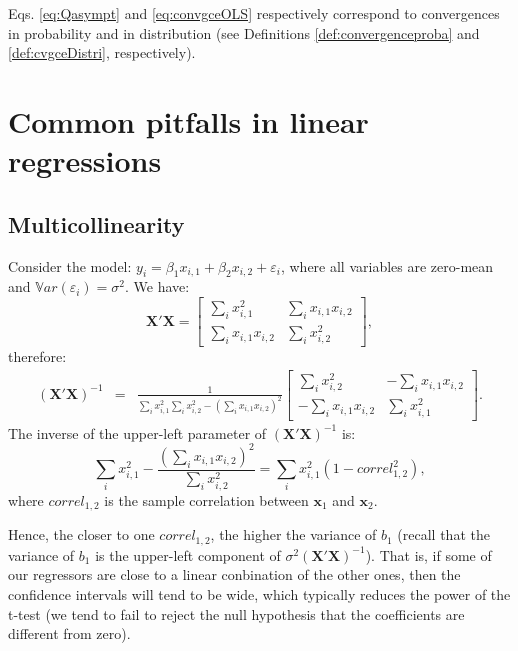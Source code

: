 \documentclass[
  12pt,
]{book}
\theoremstyle{definition}
\theoremstyle{definition}
\theoremstyle{definition}
\theoremstyle{definition}
\theoremstyle{remark}
\begin{document}
Eqs. \eqref{eq:Qasympt} and \eqref{eq:convgceOLS} respectively correspond to convergences in probability and in distribution (see Definitions \ref{def:convergenceproba} and \ref{def:cvgceDistri}, respectively).

\hypertarget{CommonPitfalls}{%
\section{Common pitfalls in linear regressions}\label{CommonPitfalls}}

\hypertarget{multicollinearity}{%
\subsection{Multicollinearity}\label{multicollinearity}}

Consider the model: \(y_i = \beta_1 x_{i,1} + \beta_2 x_{i,2} + \varepsilon_i\), where all variables are zero-mean and \(\mathbb{V}ar(\varepsilon_i)=\sigma^2\). We have:
\[
\mathbf{X}'\mathbf{X} = \left[ \begin{array}{cc}
\sum_i x_{i,1}^2 & \sum_i x_{i,1} x_{i,2} \\
\sum_i x_{i,1} x_{i,2} & \sum_i x_{i,2}^2
\end{array}\right],
\]
therefore:
\begin{eqnarray*}
(\mathbf{X}'\mathbf{X})^{-1} &=& \frac{1}{\sum_i x_{i,1}^2\sum_i x_{i,2}^2 - (\sum_i x_{i,1} x_{i,2})^2} \left[ \begin{array}{cc}
\sum_i x_{i,2}^2 & -\sum_i x_{i,1} x_{i,2} \\
-\sum_i x_{i,1} x_{i,2} & \sum_i x_{i,1}^2
\end{array}\right].
\end{eqnarray*}
The inverse of the upper-left parameter of \((\mathbf{X}'\mathbf{X})^{-1}\) is:
\begin{equation}
\sum_i x_{i,1}^2 - \frac{(\sum_i x_{i,1} x_{i,2})^2}{\sum_i x_{i,2}^2} = \sum_i x_{i,1}^2(1 - correl_{1,2}^2),\label{eq:multicollin}
\end{equation}
where \(correl_{1,2}\) is the sample correlation between \(\mathbf{x}_{1}\) and \(\mathbf{x}_{2}\).

Hence, the closer to one \(correl_{1,2}\), the higher the variance of \(b_1\) (recall that the variance of \(b_1\) is the upper-left component of \(\sigma^2(\mathbf{X}'\mathbf{X})^{-1}\)). That is, if some of our regressors are close to a linear conbination of the other ones, then the confidence intervals will tend to be wide, which typically reduces the power of the t-test (we tend to fail to reject the null hypothesis that the coefficients are different from zero).
\end{document}
